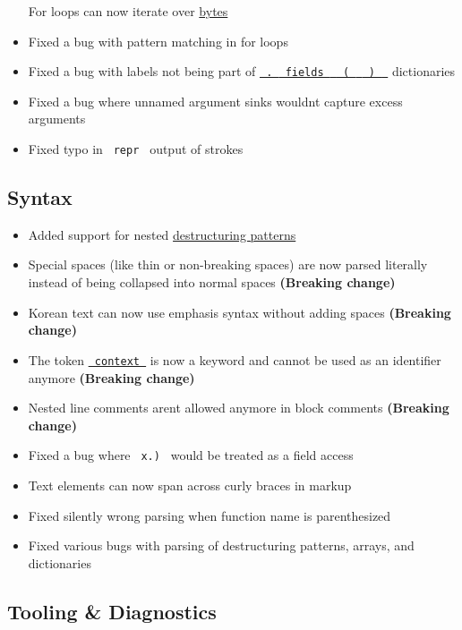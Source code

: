 \begin{itemize}
  For loops can now iterate over
  \href{/docs/reference/foundations/bytes/}{bytes}
\item
  Fixed a bug with pattern matching in for loops
\item
  Fixed a bug with labels not being part of
  \href{/docs/reference/foundations/content/\#definitions-fields}{\texttt{\ .\ }{\texttt{\ fields\ }}\texttt{\ }{\texttt{\ (\ }}\texttt{\ }{\texttt{\ )\ }}\texttt{\ }}
  dictionaries
\item
  Fixed a bug where unnamed argument sinks wouldn\textquotesingle t
  capture excess arguments
\item
  Fixed typo in \texttt{\ repr\ } output of strokes
\end{itemize}

\subsection{Syntax}\label{syntax}

\begin{itemize}
\tightlist
\item
  Added support for nested
  \href{/docs/reference/scripting/\#bindings}{destructuring patterns}
\item
  Special spaces (like thin or non-breaking spaces) are now parsed
  literally instead of being collapsed into normal spaces
  \textbf{(Breaking change)}
\item
  Korean text can now use emphasis syntax without adding spaces
  \textbf{(Breaking change)}
\item
  The token \href{/docs/reference/context/}{\texttt{\ context\ }} is now
  a keyword and cannot be used as an identifier anymore
  \textbf{(Breaking change)}
\item
  Nested line comments aren\textquotesingle t allowed anymore in block
  comments \textbf{(Breaking change)}
\item
  Fixed a bug where \texttt{\ x.)\ } would be treated as a field access
\item
  Text elements can now span across curly braces in markup
\item
  Fixed silently wrong parsing when function name is parenthesized
\item
  Fixed various bugs with parsing of destructuring patterns, arrays, and
  dictionaries
\end{itemize}

\subsection{Tooling \& Diagnostics}\label{tooling-diagnostics}

